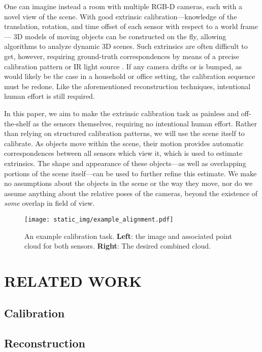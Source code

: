 \documentclass[letterpaper, 10 pt, conference]{ieeeconf}  %
\begin{document}
One can imagine instead a room with multiple RGB-D cameras, each with a novel view of the scene. With good 
extrinsic calibration---knowledge of the translation, rotation, and time offset of each sensor with respect to a world frame---
3D models of moving objects can be constructed on the fly, allowing algorithms to analyze dynamic 3D scenes. Such extrinsics 
are often difficult to get, however, requiring ground-truth correspondences by means of a precise calibration pattern 
\cite{checkerboard} or IR light source \cite{IRlight}. If any camera drifts or is bumped, as would likely be the case in 
a household or office setting, the calibration sequence must be redone. Like the aforementioned reconstruction techniques, 
intentional human effort is still required.

In this paper, we aim to make the extrinsic calibration task as painless and off-the-shelf as the sensors themselves, 
requiring no intentional human effort. Rather than relying on structured calibration patterns, 
we will use the scene itself to calibrate. As objects move within the scene, their motion provides automatic
correspondences between all sensors which view it, which is used to estimate extrinsics. 
The shape and appearance of these objects---as well as overlapping portions of the scene itself---can be used to further 
refine this estimate. We make no assumptions about the objects in the scene or the way they move, nor do we assume anything 
about the relative poses of the cameras, beyond the existence of \emph{some} overlap in field of view.


\begin{figure*}
  \centering
  \texttt{[image: static\_img/example\_alignment.pdf]}
  \caption{An example calibration task. \textbf{Left}: the image and associated point cloud for both sensors. \textbf{Right}: The desired combined cloud.}
  \label{fig:example_alignment}
\end{figure*}

\section{RELATED WORK}
\cite{rubleeorb}
\subsection{Calibration}

\subsection{Reconstruction}
\end{document}
